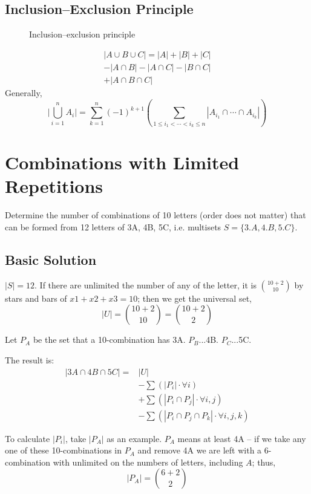 \subsection{Inclusion–Exclusion Principle}
\begin{figure}[hbtp]
\centering
{}
\caption{Inclusion–exclusion principle}
\label{fig:500px-Inclusion-exclusion}
\end{figure}
\begin{eqnarray*}
|A \cup B \cup C| = |A| + |B| + |C| \\ - |A \cap B| - |A \cap C| - |B \cap C| \\ + |A \cap B \cap C|
\end{eqnarray*}
Generally,
$$
\Biggl|\bigcup_{i=1}^n A_i\Biggr| = \sum_{k = 1}^{n} (-1)^{k+1} \left( \sum_{1 \leq i_{1} < \cdots < i_{k} \leq n} \left| A_{i_{1}} \cap \cdots \cap A_{i_{k}} \right| \right)
$$
\section{Combinations with Limited Repetitions}
Determine the number of combinations of 10 letters (order does not matter) that can be formed from 12 letters of 3A, 4B, 5C, i.e. multisets $S=\{3.A, 4.B, 5.C\}$. 

\subsection{Basic Solution}
$|S| = 12$. If there are unlimited the number of any of the letter, it is ${10+2 \choose 10}$ by stars and bars of $x1+x2+x3=10$; then we get the universal set, 
$$
|U|={10+2 \choose 10}={10+2 \choose 2}
$$

Let $P_A$ be the set that a 10-combination has  3A. $P_B$...4B. $P_C$...5C. 

The result is:
\begin{align*}
|3A \cap 4B \cap 5C| = & |U|\\
& - \sum{(|P_i|\cdot \forall i)} \\
& + \sum{(|P_i \cap P_j|\cdot \forall i,j)}\\
& - \sum{(|P_i \cap P_j \cap P_k|\cdot \forall i,j,k)}
\end{align*}

To calculate $|P_i|$, take $|P_A|$ as an example. $P_A$ means at least 4A -- if we take any one of these 10-combinations in $P_A$ and remove 4A we are left with a 6-combination with unlimited on the numbers of letters, including $A$; thus,
$$
|P_A|={6+2 \choose 2}
$$

